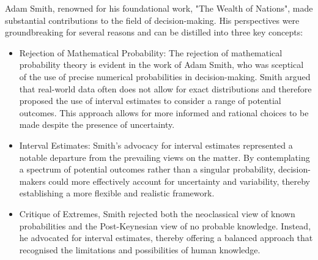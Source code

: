\noindent Adam Smith, renowned for his foundational work, "The Wealth of Nations"\cite{noauthor_adam_2024}, made substantial contributions to the field of decision-making. His perspectives were groundbreaking for several reasons and can be distilled into three key concepts: 


\begin{itemize}
\item Rejection of Mathematical Probability: The rejection of mathematical probability theory is evident in the work of Adam Smith, who was sceptical of the use of precise numerical probabilities in decision-making. Smith argued that real-world data often does not allow for exact distributions and therefore proposed the use of interval estimates to consider a range of potential outcomes. This approach allows for more informed and rational choices to be made despite the presence of uncertainty.

\item Interval Estimates: Smith's advocacy for interval estimates represented a notable departure from the prevailing views on the matter. By contemplating a spectrum of potential outcomes rather than a singular probability, decision-makers could more effectively account for uncertainty and variability, thereby establishing a more flexible and realistic framework.

\item Critique of Extremes, Smith rejected both the neoclassical view of known probabilities and the Post-Keynesian view of no probable knowledge. Instead, he advocated for interval estimates, thereby offering a balanced approach that recognised the limitations and possibilities of human knowledge.

\end{itemize}


